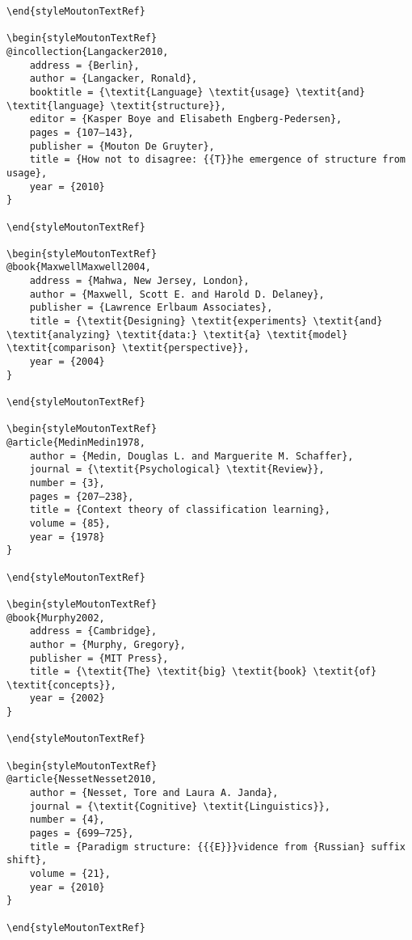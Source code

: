 \begin{styleMoutonHeadingi}
\begin{verbatim}
\end{styleMoutonTextRef}

\begin{styleMoutonTextRef}
@incollection{Langacker2010,
	address = {Berlin},
	author = {Langacker, Ronald},
	booktitle = {\textit{Language} \textit{usage} \textit{and} \textit{language} \textit{structure}},
	editor = {Kasper Boye and Elisabeth Engberg-Pedersen},
	pages = {107–143},
	publisher = {Mouton De Gruyter},
	title = {How not to disagree: {{T}}he emergence of structure from usage},
	year = {2010}
}

\end{styleMoutonTextRef}

\begin{styleMoutonTextRef}
@book{MaxwellMaxwell2004,
	address = {Mahwa, New Jersey, London},
	author = {Maxwell, Scott E. and Harold D. Delaney},
	publisher = {Lawrence Erlbaum Associates},
	title = {\textit{Designing} \textit{experiments} \textit{and} \textit{analyzing} \textit{data:} \textit{a} \textit{model} \textit{comparison} \textit{perspective}},
	year = {2004}
}

\end{styleMoutonTextRef}

\begin{styleMoutonTextRef}
@article{MedinMedin1978,
	author = {Medin, Douglas L. and Marguerite M. Schaffer},
	journal = {\textit{Psychological} \textit{Review}},
	number = {3},
	pages = {207–238},
	title = {Context theory of classification learning},
	volume = {85},
	year = {1978}
}

\end{styleMoutonTextRef}

\begin{styleMoutonTextRef}
@book{Murphy2002,
	address = {Cambridge},
	author = {Murphy, Gregory},
	publisher = {MIT Press},
	title = {\textit{The} \textit{big} \textit{book} \textit{of} \textit{concepts}},
	year = {2002}
}

\end{styleMoutonTextRef}

\begin{styleMoutonTextRef}
@article{NessetNesset2010,
	author = {Nesset, Tore and Laura A. Janda},
	journal = {\textit{Cognitive} \textit{Linguistics}},
	number = {4},
	pages = {699–725},
	title = {Paradigm structure: {{{E}}}vidence from {Russian} suffix shift},
	volume = {21},
	year = {2010}
}

\end{styleMoutonTextRef}


\end{verbatim}
\end{styleMoutonHeadingi}
